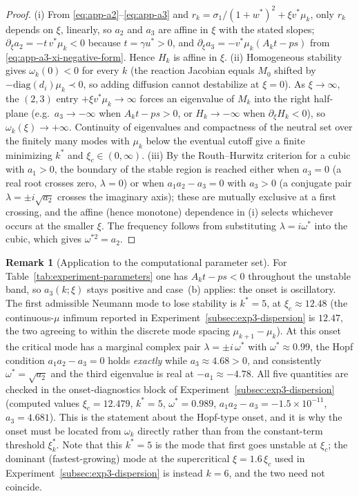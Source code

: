 \documentclass[a4paper,fleqn,longmktitle]{cas-sc}
\theoremstyle{plain}
\theoremstyle{definition}
\newtheorem{remark}[theorem]{Remark}
\numberwithin{equation}{section}
\begin{document}
\begin{proof}
(i) From \eqref{eq:app-a2}--\eqref{eq:app-a3} and
$r_k=\sigma_1/(1+w^*)^2+\xi v^*\mu_k$, only $r_k$ depends on $\xi$, linearly, so
$a_2$ and $a_3$ are affine in $\xi$ with the stated slopes; $\partial_\xi a_2=-t\,v^*\mu_k<0$
because $t=\gamma u^*>0$, and $\partial_\xi a_3=-v^*\mu_k(A_kt-ps)$ from
\eqref{eq:app-a3-xi-negative-form}. Hence $H_k$ is affine in $\xi$.
(ii) Homogeneous stability gives $\omega_k(0)<0$ for every $k$ (the reaction
Jacobian equals $M_0$ shifted by $-\mathrm{diag}(d_i)\mu_k\prec0$, so adding
diffusion cannot destabilize at $\xi=0$). As $\xi\to\infty$, the $(2,3)$ entry
$+\xi v^*\mu_k\to\infty$ forces an eigenvalue of $M_k$ into the right half-plane
(e.g.\ $a_3\to-\infty$ when $A_kt-ps>0$, or $H_k\to-\infty$ when
$\partial_\xi H_k<0$), so $\omega_k(\xi)\to+\infty$. Continuity of eigenvalues
and compactness of the neutral set over the finitely many modes with
$\mu_k$ below the eventual cutoff give a finite minimizing $k^*$ and
$\xi_c\in(0,\infty)$.
(iii) By the Routh--Hurwitz criterion for a cubic with $a_1>0$, the boundary of
the stable region is reached either when $a_3=0$ (a real root crosses zero,
$\lambda=0$) or when $a_1a_2-a_3=0$ with $a_3>0$ (a conjugate pair
$\lambda=\pm i\sqrt{a_2}$ crosses the imaginary axis); these are mutually
exclusive at a first crossing, and the affine (hence monotone) dependence in (i)
selects whichever occurs at the smaller $\xi$. The frequency follows from
substituting $\lambda=i\omega^\ast$ into the cubic, which gives
$\omega^{\ast2}=a_2$.
\end{proof}

\begin{remark}[Application to the computational parameter set]
\label{rem:hopf-onset-quant}
For Table~\ref{tab:experiment-parameters} one has $A_kt-ps<0$ throughout the
unstable band, so $a_3(k;\xi)$ stays positive and case~(b) applies: the onset is
oscillatory. The first admissible Neumann mode to lose stability is $k^*=5$, at
$\xi_c\approx12.48$ (the continuous-$\mu$ infimum reported in
Experiment~\ref{subsec:exp3-dispersion} is $12.47$, the two agreeing to within
the discrete mode spacing $\mu_{k+1}-\mu_k$). At this onset the critical mode has
a marginal complex pair $\lambda=\pm i\,\omega^\ast$ with $\omega^\ast\approx0.99$,
the Hopf condition $a_1a_2-a_3=0$ holds \emph{exactly} while $a_3\approx4.68>0$,
and consistently $\omega^\ast=\sqrt{a_2}$ and the third eigenvalue is real at
$-a_1\approx-4.78$. All five quantities are checked in the onset-diagnostics block
of Experiment~\ref{subsec:exp3-dispersion} (computed values
$\xi_c=12.479$, $k^*=5$, $\omega^\ast=0.989$, $a_1a_2-a_3=-1.5\times10^{-11}$,
$a_3=4.681$). This is the statement about the Hopf-type onset, and it is why
the onset must be located from $\omega_k$ directly rather than from the
constant-term threshold $\xi_k^*$. Note that this $k^*=5$ is the mode that first
goes unstable at $\xi_c$; the dominant (fastest-growing) mode at the supercritical
$\xi=1.6\,\xi_c$ used in Experiment~\ref{subsec:exp3-dispersion} is instead
$k=6$, and the two need not coincide.
\end{remark}
\end{document}
